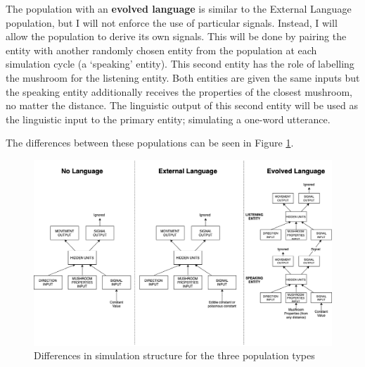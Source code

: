 \documentclass[12pt,a4paper,twoside,openright]{report}
\begin{document}
The population with an {\bf evolved language} is similar to the External Language population, but I will not enforce the use of particular signals. Instead, I will allow the population to derive its own signals. This will be done by pairing the entity with another randomly chosen entity from the population at each simulation cycle (a `speaking' entity). This second entity has the role of labelling the mushroom for the listening entity. Both entities are given the same inputs but the speaking entity additionally receives the properties of the closest mushroom, no matter the distance. The linguistic output of this second entity will be used as the linguistic input to the primary entity; simulating a one-word utterance.

The differences between these populations can be seen in Figure \ref{fig:populations}.

\begin{figure}[t]
  \centering
  \includegraphics[width=1.\linewidth]{figs/populations}
  \caption{Differences in simulation structure for the three population types}
  \label{fig:populations}
\end{figure}
\end{document}
